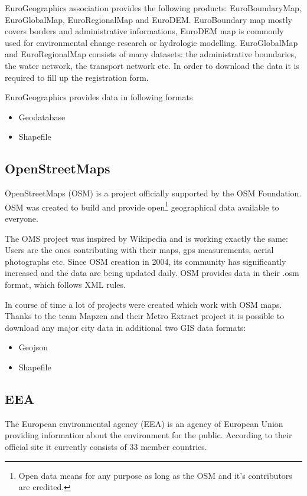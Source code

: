 \documentclass[thesis=M,english]{FITthesis}[2012/10/20]
\begin{document}
EuroGeographics association provides the following products: EuroBoundaryMap, EuroGlobalMap, EuroRegionalMap and EuroDEM.
EuroBoundary map mostly covers borders and administrative informations, EuroDEM map is commonly used for environmental change research or hydrologic modelling.
EuroGlobalMap and EuroRegionalMap consists of many datasets: the administrative boundaries, the water network, the transport network etc. 
In order to download the data it is required to fill up the registration form.

EuroGeographics provides data in following formats

\begin{itemize}
\item Geodatabase
\item Shapefile
\end{itemize}


\subsection{OpenStreetMaps}
OpenStreetMaps (OSM) is a project officially supported by the OSM Foundation.
OSM was created to build and provide open\footnote{Open data means for any purpose as long as the OSM and it's contributors are credited.} geographical data available to everyone.  

The OMS project was inspired by Wikipedia and is working exactly the same: Users are the ones contributing with their maps, gps measurements, aerial photographs etc. Since OSM creation in 2004, its community has significantly increased and the data are being updated daily.
OSM provides data in their .osm format, which follows XML rules.

In course of time a lot of projects were created which work with OSM maps.
Thanks to the team Mapzen and their Metro Extract project it is possible to download any major city data in additional two GIS data formats:
\begin{itemize}
\item Geojson
\item Shapefile
\end{itemize}

\subsection{EEA}
The European environmental agency (EEA) is an agency of European Union providing information about the environment for the public. According to their official site \cite{EEA16} it currently consists of 33 member countries.
\end{document}
